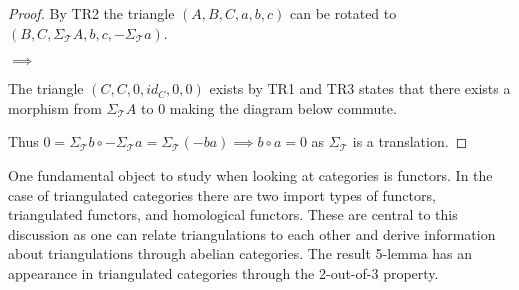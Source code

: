     \begin{proof}
        By TR2 the triangle $(A,B,C,a,b,c)$ can be rotated to $(B,C,\Sigma_{\mathcal{T}}A,b,c,-\Sigma_{\mathcal{T}}a)$.
        \begin{center}
             $\implies$
        \end{center}
        The triangle $(C,C,0,id_C,0,0)$ exists by TR1 and TR3 states that there exists a morphism from $\Sigma_{\mathcal{T}}A$ to 0 making the diagram below commute.
        \begin{center}
        \end{center}
        Thus $0 = \Sigma_{\mathcal{T}}b\circ -\Sigma_{\mathcal{T}}a = \Sigma_{\mathcal{T}}(-ba) \implies b\circ a = 0$ as $\Sigma_{\mathcal{T}}$ is a translation.
    \end{proof}
    One fundamental object to study when looking at categories is functors. In the case of triangulated categories there are two import types of functors, triangulated functors, and homological functors. These are central to this discussion as one can relate triangulations to each other and derive information about triangulations through abelian categories. The result 5-lemma has an appearance in triangulated categories through the 2-out-of-3 property.
    
